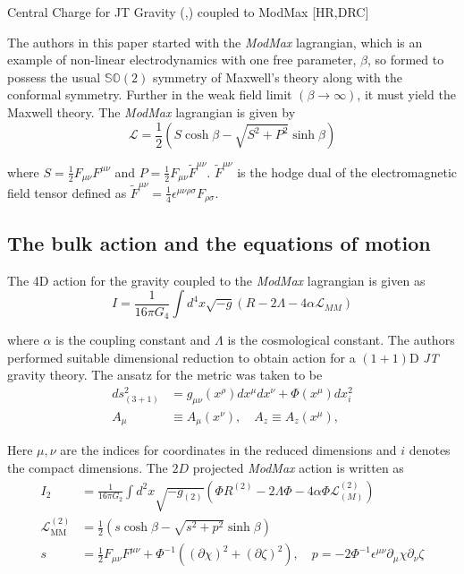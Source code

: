 \begin{frame}[allowframebreaks]{Central Charge for JT Gravity (\cite{jackiw1985lower},\cite{teitelboim1983gravitation}) coupled to ModMax {\color{red}\scriptsize [HR,DRC]\cite{rathi2023ads2}}}

The authors in this paper started with the \textit{ModMax} lagrangian, which is an example of non-linear electrodynamics with one free parameter, $\beta$, so formed to possess the usual $\mathbb{SO}(2)$ symmetry of Maxwell's theory along with the conformal symmetry. Further in the weak field limit $\left( \beta \to \infty \right) $, it must yield the Maxwell theory. The \textit{ModMax} lagrangian is given by
\begin{equation}
    \label{eqn:modmax-lagrangian}
    \mathcal{L} = \frac{1}{2} \left( S \cosh\beta - \sqrt{S^2+P^2}\sinh\beta  \right)
\end{equation}

where $S=\frac{1}{2}F_{\mu\nu}F^{\mu\nu}$ and $P=\frac{1}{2}F_{\mu\nu}\tilde{F}^{\mu\nu}$. $\tilde{F}^{\mu\nu}$ is the hodge dual of the electromagnetic field tensor defined as $\tilde{F}^{\mu\nu} = \frac{1}{4}\epsilon^{\mu\nu\rho\sigma}F_{\rho\sigma}$.


\subsection{The bulk action and the equations of motion}
The 4D action for the gravity coupled to the \textit{ModMax} lagrangian is given as 
\begin{equation}
    I = \frac{1}{16\pi G_4}\int d^4x\sqrt{-g}\left(R - 2\Lambda - 4\alpha\mathcal{L}_{MM}\right)
\end{equation}

where $\alpha$ is the coupling constant and $\Lambda$ is the cosmological constant. The authors performed suitable dimensional reduction to obtain action for a $\left( 1+1 \right)$D \textit{JT} gravity theory. The ansatz for the metric was taken to be 
\begin{align}
    ds_{(3+1)}^2 &= g_{\mu\nu}(x^\rho)dx^\mu dx^\nu + \Phi(x^\mu)dx_i^2 \\
    A_\mu &\equiv A_\mu(x^\nu), \quad A_z \equiv A_z(x^\mu),
\end{align}

Here $\mu, \nu$ are the indices for coordinates in the reduced dimensions and $i$ denotes the compact dimensions. The $2D$ projected \textit{ModMax} action is written as 
\begin{align}
    I_2 &= \frac{1}{16\pi G_2}\int d^2x\sqrt{-g_{(2)}}\left(\Phi R^{(2)} - 2\Lambda\Phi - 4\alpha\Phi\mathcal{L}_{(M)}^{(2)}\right) \\ 
    \mathcal{L}_{\text{MM}}^{(2)} &= \frac{1}{2}\left(s\cosh\beta - \sqrt{s^2 + p^2}\sinh\beta\right) \\
    s &= \frac{1}{2}F_{\mu\nu}F^{\mu\nu} + \Phi^{-1}\left((\partial\chi)^2 + (\partial\zeta)^2\right), \quad p = -2\Phi^{-1}\epsilon^{\mu\nu}\partial_\mu\chi\partial_\nu\zeta
\end{align}


\end{frame}
